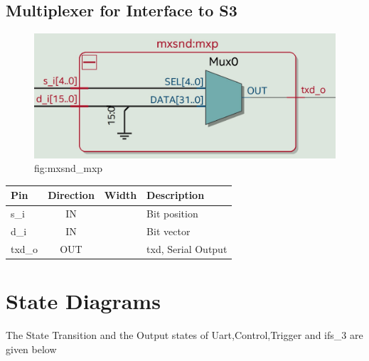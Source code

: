 \documentclass[12pt,a4 paper] {report}
\begin{document}
\subsection{Multiplexer for Interface to S3}
\begin{figure}[h]
	\centering	
	\includegraphics[scale=0.2]{../png/mxsnd_mxp.png}
	\newline
	fig:mxsnd\_mxp\\
\end{figure}
\begin{center}
	\begin{tabular}{ | p{2cm} | c | c | p{5cm} |}
		\hline
		\textbf{Pin} & \textbf{Direction} & \textbf{Width} & \textbf{Description} \\
		\hline
		s\_i & IN &  & Bit position \\
		\hline
		d\_i & IN &  &  Bit vector \\
		\hline	
		txd\_o & OUT &  & txd, Serial Output \\
		\hline
		
	\end{tabular}
\end{center}

\newpage

\section{State Diagrams}
The State Transition and the Output states of Uart,Control,Trigger and ifs\_3 are given below\\

\newpage
\end{document}
